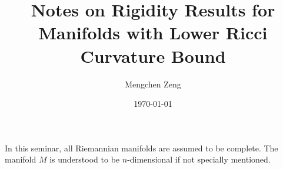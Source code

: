 \documentclass{amsart}
\title[Ricci Rigidity Notes]{Notes on Rigidity Results for Manifolds with Lower Ricci Curvature Bound}
\author{Mengchen Zeng}
\date{\today}
\theoremstyle{definition}
\theoremstyle{plain}
\theoremstyle{remark}
\numberwithin{equation}{section}
\begin{document}
\maketitle

In this seminar, all Riemannian manifolds are assumed to be complete.
The manifold $M$ is understood to be $n$-dimensional if not specially mentioned.




\end{document}
